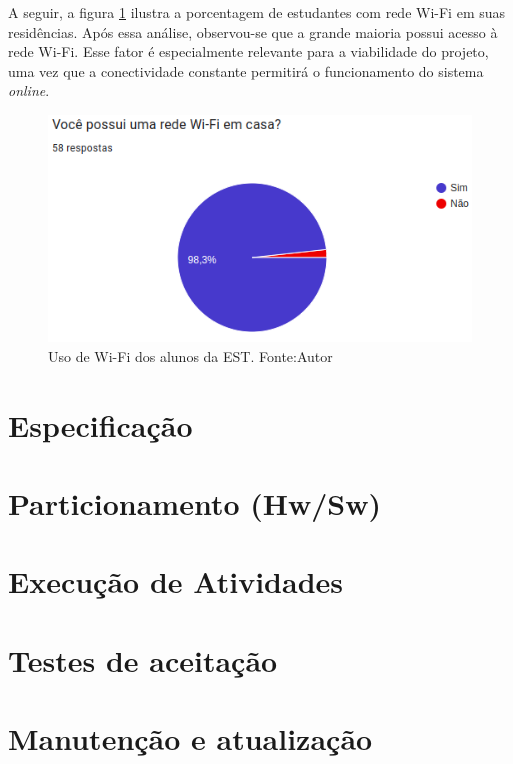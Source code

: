 A seguir, a figura \ref{figWifiAlunos} ilustra a porcentagem de estudantes com rede Wi-Fi em suas residências. Após essa análise, observou-se que 
a grande maioria possui acesso à rede Wi-Fi. Esse fator é especialmente relevante para a viabilidade do projeto, uma vez que a conectividade 
constante permitirá o funcionamento do sistema \textit{online}.

\begin{figure}[ht]
    \centering
    \includegraphics[width=.67\textwidth]{img/graf1-wifi.png}
    \caption{Uso de Wi-Fi dos alunos da EST. Fonte:Autor}\label{figWifiAlunos}
\end{figure}

\section{Especificação}\label{fase2}

\section{Particionamento (Hw/Sw)}\label{fase3}

\section{Execução de Atividades}\label{fase4}

\section{Testes de aceitação}\label{fase5}

\section{Manutenção e atualização}\label{fase6}